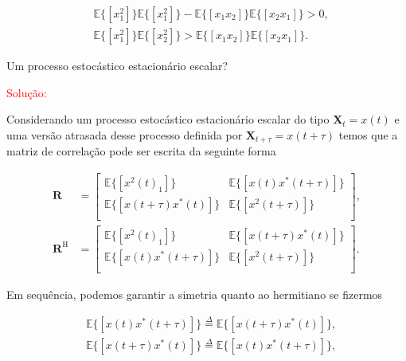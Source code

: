         \begin{align}
            &\mathbb{E}\{[x^{2}_{1}]\} \mathbb{E}\{[x^{2}_{1}]\} - \mathbb{E}\{[x_{1}x_{2}]\} \mathbb{E}\{[x_{2}x_{1}]\} > 0, \\
            &\mathbb{E}\{[x_{1}^{2}]\} \mathbb{E}\{[x^{2}_{2}]\} > \mathbb{E}\{[x_{1}x_{2}]\} \mathbb{E}\{[x_{2}x_{1}]\}.
        \end{align}

     Um processo estocástico estacionário escalar?
    
        \textcolor{red}{Solução:}
        
        Considerando um processo estocástico estacionário escalar do tipo $\mathbf{X}_{t} = x(t)$ e uma versão atrasada desse
        processo definida por $\mathbf{X}_{t + \tau} = x(t + \tau)$ temos que a matriz de correlação pode ser escrita da seguinte forma
        
        \begin{align}
            \mathbf{R} &= \left[ 
            \begin{matrix}
                \mathbb{E}\{[x^{2}(t)_{1}]\} & \mathbb{E}\{[x(t)x^{*}(t + \tau)]\} \\
                \mathbb{E}\{[x(t + \tau)x^{*}(t)]\} & \mathbb{E}\{[x^{2}(t + \tau)]\} \\
            \end{matrix} \right], \\
            \mathbf{R}^{\text{H}} &= \left[ 
            \begin{matrix}
                \mathbb{E}\{[x^{2}(t)_{1}]\} & \mathbb{E}\{[x(t + \tau)x^{*}(t)]\} \\
                \mathbb{E}\{[x(t)x^{*}(t + \tau)]\} & \mathbb{E}\{[x^{2}(t + \tau)]\} \\
            \end{matrix} \right].
        \end{align}
        
        
        Em sequência, podemos garantir a simetria quanto ao hermitiano se fizermos 
        
        \begin{align}
            &\mathbb{E}\{[x(t)x^{*}(t + \tau)]\} \overset{\Delta}{=} \mathbb{E}\{[x(t + \tau)x^{*}(t)]\}, \\
            &\mathbb{E}\{[x(t + \tau)x^{*}(t)]\} \overset{\Delta}{=} \mathbb{E}\{[x(t)x^{*}(t + \tau)]\},
        \end{align}
        
